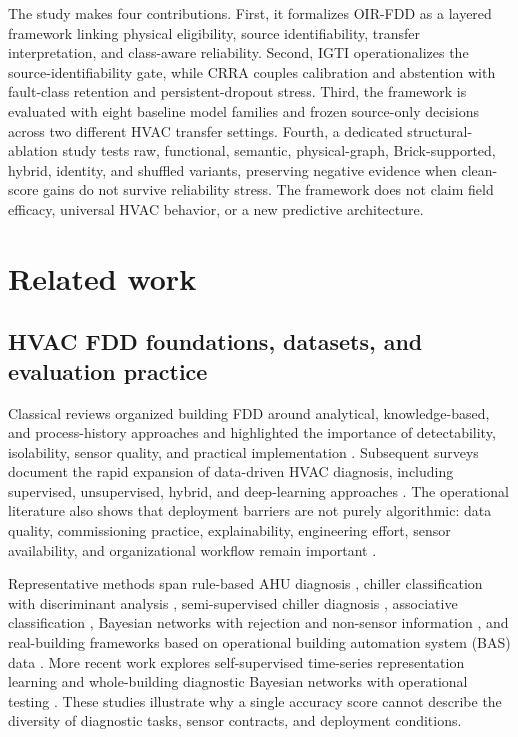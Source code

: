 \documentclass[preprint,12pt]{elsarticle}
\begin{document}
The study makes four contributions. First, it formalizes OIR-FDD as a layered framework linking physical eligibility, source identifiability, transfer interpretation, and class-aware reliability. Second, IGTI operationalizes the source-identifiability gate, while CRRA couples calibration and abstention with fault-class retention and persistent-dropout stress. Third, the framework is evaluated with eight baseline model families and frozen source-only decisions across two different HVAC transfer settings. Fourth, a dedicated structural-ablation study tests raw, functional, semantic, physical-graph, Brick-supported, hybrid, identity, and shuffled variants, preserving negative evidence when clean-score gains do not survive reliability stress. The framework does not claim field efficacy, universal HVAC behavior, or a new predictive architecture.

\section{Related work}
\subsection{HVAC FDD foundations, datasets, and evaluation practice}
Classical reviews organized building FDD around analytical, knowledge-based, and process-history approaches and highlighted the importance of detectability, isolability, sensor quality, and practical implementation \cite{katipamula2005a,katipamula2005b,kim2018review,yu2014ahureview}. Subsequent surveys document the rapid expansion of data-driven HVAC diagnosis, including supervised, unsupervised, hybrid, and deep-learning approaches \cite{mirnaghi2020review,chen2022review,chen2023review,bi2024review,singh2022review}. The operational literature also shows that deployment barriers are not purely algorithmic: data quality, commissioning practice, explainability, engineering effort, sensor availability, and organizational workflow remain important \cite{shi2019review,andersen2024barriers}.

Representative methods span rule-based AHU diagnosis \cite{schein2006rule}, chiller classification with discriminant analysis \cite{li2016lda}, semi-supervised chiller diagnosis \cite{beghi2016chiller}, associative classification \cite{huang2018assoc}, Bayesian networks with rejection and non-sensor information \cite{wang2017bayes}, and real-building frameworks based on operational building automation system (BAS) data \cite{soultanzadeh2024framework}. More recent work explores self-supervised time-series representation learning \cite{wang2026selfsup} and whole-building diagnostic Bayesian networks with operational testing \cite{mosteiro2026dbn}. These studies illustrate why a single accuracy score cannot describe the diversity of diagnostic tasks, sensor contracts, and deployment conditions.
\end{document}
